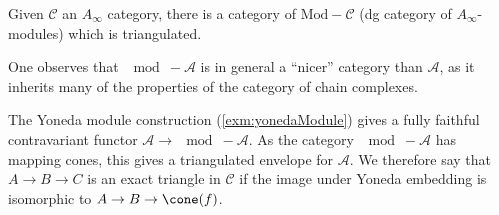 
 Given $\mathcal C$ an $A_\infty$ category, there is a category of $\text{Mod}-\mathcal C$ (dg category of $A_\infty$-modules) which is triangulated.








One observes that $\mod-\mathcal A$ is in general a ``nicer'' category than $\mathcal A$, as it inherits many of the properties of the category of chain complexes.


The Yoneda module construction (\cref{exm:yonedaModule}) gives a fully faithful contravariant functor $\mathcal A \to \mod-\mathcal A$.
As the category $\mod-\mathcal A$ has mapping cones, this gives a triangulated envelope for $\mathcal A$.
We therefore say that $A\to B \to C$ is an exact triangle in $\mathcal C$ if the image under Yoneda embedding is isomorphic to $A\to B \to \cone(f)$.
